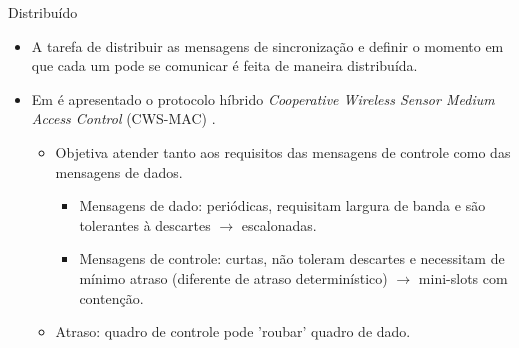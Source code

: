 \documentclass{beamer}
\begin{document}
\begin{frame}{Distribuído}
\hypertarget{cws-mac_back}{}
  \begin{itemize}
    \item A tarefa de distribuir as mensagens de sincronização e definir o momento em que cada um pode se comunicar é feita de maneira distribuída.
    \item Em \cite{20083811560517} é apresentado o protocolo híbrido \emph{Cooperative Wireless Sensor Medium Access Control} (CWS-MAC) \hyperlink{cws-mac}{}.
    \begin{itemize}
      \item Objetiva atender tanto aos requisitos das mensagens de controle como das mensagens de dados.
      \begin{itemize}
	\item Mensagens de dado: periódicas, requisitam largura de banda e são tolerantes à descartes $\rightarrow$ escalonadas.
	\item Mensagens de controle: curtas, não toleram descartes e necessitam de mínimo atraso (diferente de atraso determinístico) $\rightarrow$ mini-slots com contenção.
      \end{itemize}
      \item
	Atraso: quadro de controle pode 'roubar' quadro de dado.
    \end{itemize}
  \end{itemize}
\end{frame}
\end{document}
